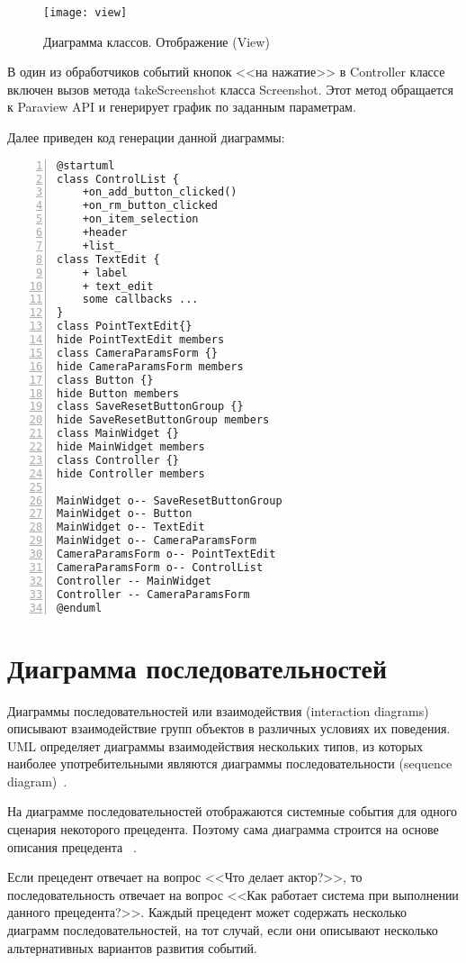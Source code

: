 \documentclass[14pt]{extreport}
\begin{document}
\begin{figure}[H]
	\centerline{\texttt{[image: view]}}
	\caption{Диаграмма классов. Отображение (View)}
	\label{fig8}
\end{figure}

В один из обработчиков событий кнопок <<на нажатие>> в Controller классе включен вызов метода takeScreenshot класса Screenshot. Этот метод обращается к Paraview API и генерирует график по заданным параметрам.

Далее приведен код генерации данной диаграммы: 
\begin{Verbatim}[numbers=left,xleftmargin=5mm,fontsize=\small]
@startuml
class ControlList {
	+on_add_button_clicked()
	+on_rm_button_clicked
	+on_item_selection
	+header
	+list_
class TextEdit {
	+ label
	+ text_edit
	some callbacks ...
}
class PointTextEdit{}
hide PointTextEdit members
class CameraParamsForm {}
hide CameraParamsForm members
class Button {}
hide Button members
class SaveResetButtonGroup {}
hide SaveResetButtonGroup members
class MainWidget {}
hide MainWidget members
class Controller {}
hide Controller members

MainWidget o-- SaveResetButtonGroup
MainWidget o-- Button
MainWidget o-- TextEdit
MainWidget o-- CameraParamsForm
CameraParamsForm o-- PointTextEdit
CameraParamsForm o-- ControlList
Controller -- MainWidget
Controller -- CameraParamsForm
@enduml
\end{Verbatim}


\section{Диаграмма последовательностей}
Диаграммы последовательностей или взаимодействия (interaction diagrams) описывают взаимодействие групп объектов в различных условиях их поведения. UML определяет диаграммы взаимодействия нескольких типов, из которых наиболее употребительными являются диаграммы последовательности (sequence diagram)~\cite{umlDistilled}.

На диаграмме последовательностей отображаются системные события для одного
сценария некоторого прецедента. Поэтому сама диаграмма строится на основе описания прецедента ~\cite{umlApplying}. 

Если прецедент отвечает на вопрос <<Что делает актор?>>, то последовательность отвечает на вопрос <<Как работает система при выполнении данного прецедента?>>.
Каждый прецедент может содержать несколько диаграмм последовательностей, на тот случай, если они описывают несколько альтернативных вариантов развития событий.
\end{document}
